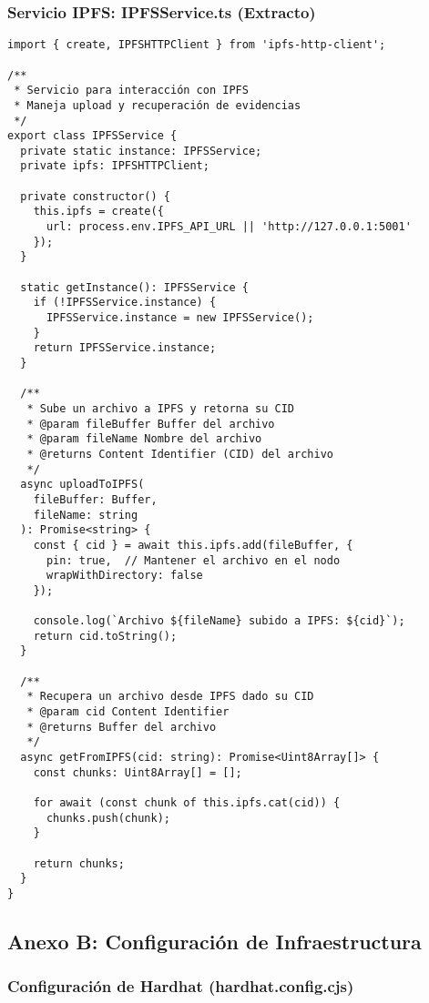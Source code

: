 \subsubsection{Servicio IPFS: IPFSService.ts (Extracto)}

\begin{verbatim}
import { create, IPFSHTTPClient } from 'ipfs-http-client';

/**
 * Servicio para interacción con IPFS
 * Maneja upload y recuperación de evidencias
 */
export class IPFSService {
  private static instance: IPFSService;
  private ipfs: IPFSHTTPClient;

  private constructor() {
    this.ipfs = create({ 
      url: process.env.IPFS_API_URL || 'http://127.0.0.1:5001' 
    });
  }

  static getInstance(): IPFSService {
    if (!IPFSService.instance) {
      IPFSService.instance = new IPFSService();
    }
    return IPFSService.instance;
  }

  /**
   * Sube un archivo a IPFS y retorna su CID
   * @param fileBuffer Buffer del archivo
   * @param fileName Nombre del archivo
   * @returns Content Identifier (CID) del archivo
   */
  async uploadToIPFS(
    fileBuffer: Buffer, 
    fileName: string
  ): Promise<string> {
    const { cid } = await this.ipfs.add(fileBuffer, {
      pin: true,  // Mantener el archivo en el nodo
      wrapWithDirectory: false
    });
    
    console.log(`Archivo ${fileName} subido a IPFS: ${cid}`);
    return cid.toString();
  }

  /**
   * Recupera un archivo desde IPFS dado su CID
   * @param cid Content Identifier
   * @returns Buffer del archivo
   */
  async getFromIPFS(cid: string): Promise<Uint8Array[]> {
    const chunks: Uint8Array[] = [];
    
    for await (const chunk of this.ipfs.cat(cid)) {
      chunks.push(chunk);
    }
    
    return chunks;
  }
}
\end{verbatim}

\subsection{Anexo B: Configuración de Infraestructura}

\subsubsection{Configuración de Hardhat (hardhat.config.cjs)}


